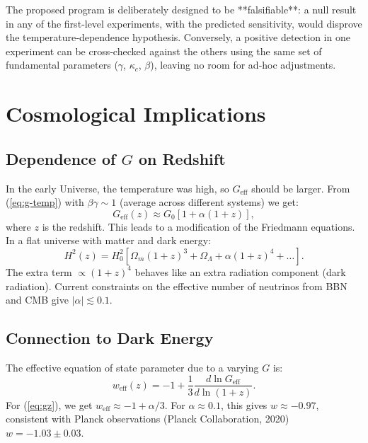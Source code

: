 \documentclass[12pt]{article}
\theoremstyle{remark}
\begin{document}
	The proposed program is deliberately designed to be **falsifiable**: a null result in any of the first‑level
	experiments, with the predicted sensitivity, would disprove the temperature‑dependence hypothesis.
	Conversely, a positive detection in one experiment can be cross‑checked against the others using the same set
	of fundamental parameters (\(\gamma\), \(\kappa_c\), \(\beta\)), leaving no room for ad‑hoc adjustments.
	
	
	\section{Cosmological Implications}
	\label{sec:cosmo}
	
	\subsection{Dependence of $G$ on Redshift}
	\label{subsec:cosmo-gz}
	
	In the early Universe, the temperature was high, so $G_{\text{eff}}$ should be larger. From (\ref{eq:g-temp}) with $\beta\gamma \sim 1$ (average across different systems) we get:
	\begin{equation}
		G_{\text{eff}}(z) \approx G_0 \left[ 1 + \alpha (1+z) \right],
		\label{eq:gz}
	\end{equation}
	where $z$ is the redshift. This leads to a modification of the Friedmann equations. In a flat universe with matter and dark energy:
	\begin{equation}
		H^2(z) = H_0^2 \left[ \Omega_m (1+z)^3 + \Omega_\Lambda + \alpha (1+z)^4 + \dots \right].
		\label{eq:friedmann}
	\end{equation}
	The extra term $\propto (1+z)^4$ behaves like an extra radiation component (dark radiation). Current constraints on the effective number of neutrinos from BBN and CMB give $|\alpha| \lesssim 0.1$.
	
	\subsection{Connection to Dark Energy}
	\label{subsec:cosmo-de}
	
	The effective equation of state parameter due to a varying $G$ is:
	\begin{equation}
		w_{\text{eff}}(z) = -1 + \frac{1}{3} \frac{d \ln G_{\text{eff}}}{d \ln(1+z)}.
		\label{eq:weff}
	\end{equation}
	For (\ref{eq:gz}), we get $w_{\text{eff}} \approx -1 + \alpha/3$. For $\alpha \approx 0.1$, this gives $w \approx -0.97$, consistent with Planck observations (Planck Collaboration, 2020) $w = -1.03 \pm 0.03$.
	
\end{document}
